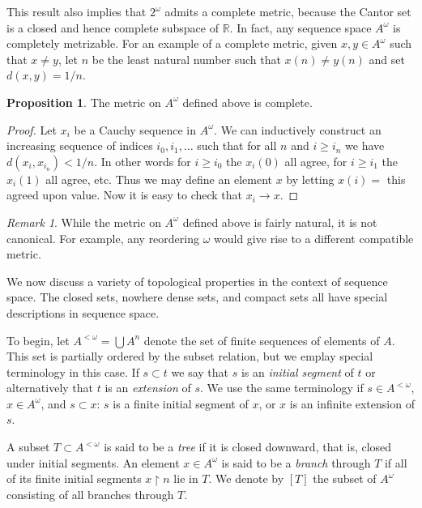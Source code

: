 \documentclass[11pt,oneside]{amsart}
\newcommand{\RR}{\mathbb R}
\theoremstyle{definition}
\newtheorem{prop}[thm]{Proposition}
\theoremstyle{definition}
\theoremstyle{remark}
\newtheorem{rem}[thm]{Remark}
\begin{document}
This result also implies that $2^\omega$ admits a complete metric, because the Cantor set is a closed and hence complete subspace of $\RR$. In fact, any sequence space $A^\omega$ is completely metrizable. For an example of a complete metric, given $x,y\in A^\omega$ such that $x\neq y$, let $n$ be the least natural number such that $x(n)\neq y(n)$ and set $d(x,y)=1/n$. 

\begin{prop}
  The metric on $A^\omega$ defined above is complete.
\end{prop}

\begin{proof}
  Let $x_i$ be a Cauchy sequence in $A^\omega$. We can inductively construct an increasing sequence of indices $i_0,i_1,\ldots$ such that for all $n$ and $i\geq i_n$ we have $d(x_i,x_{i_n})<1/n$. In other words for $i\geq i_0$ the $x_i(0)$ all agree, for $i\geq i_1$ the $x_i(1)$ all agree, etc. Thus we may define an element $x$ by letting $x(i)=$ this agreed upon value. Now it is easy to check that $x_i\to x$.
\end{proof}

\begin{rem}
  While the metric on $A^\omega$ defined above is fairly natural, it is not canonical. For example, any reordering $\omega$ would give rise to a different compatible metric.
\end{rem}

We now discuss a variety of topological properties in the context of sequence space. The closed sets, nowhere dense sets, and compact sets all have special descriptions in sequence space.

To begin, let $A^{<\omega}=\bigcup A^n$ denote the set of finite sequences of elements of $A$. This set is partially ordered by the subset relation, but we emplay special terminology in this case. If $s\subset t$ we say that $s$ is an \emph{initial segment} of $t$ or alternatively that $t$ is an \emph{extension} of $s$. We use the same terminology if $s\in A^{<\omega}$, $x\in A^\omega$, and $s\subset x$: $s$ is a finite initial segment of $x$, or $x$ is an infinite extension of $s$.

A subset $T\subset A^{<\omega}$ is said to be a \emph{tree} if it is closed downward, that is, closed under initial segments. An element $x\in A^\omega$ is said to be a \emph{branch} through $T$ if all of its finite initial segments $x\restriction n$ lie in $T$. We denote by $[T]$ the subset of $A^\omega$ consisting of all branches through $T$.
\end{document}
